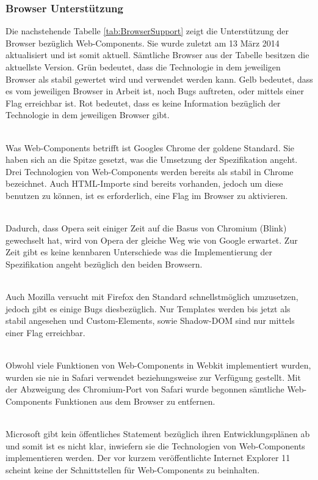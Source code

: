 \subsubsection{Browser Unterstützung}
\label{sec:3_WC_Support}

Die nachstehende Tabelle \ref{tab:BrowserSupport} zeigt die Unterstützung der Browser bezüglich Web-Components. Sie wurde zuletzt am 13 März 2014 aktualisiert und ist somit aktuell. Sämtliche Browser aus der Tabelle besitzen die aktuellste Version. Grün bedeutet, dass die Technologie in dem jeweiligen Browser als stabil gewertet wird und verwendet werden kann. Gelb bedeutet, dass es vom jeweiligen Browser in Arbeit ist, noch Bugs auftreten, oder mittels einer Flag erreichbar ist. Rot bedeutet, dass es keine Information bezüglich der Technologie in dem jeweiligen Browser gibt.

\begin{description}
 \hfill \\
Was Web-Components betrifft ist Googles Chrome der goldene Standard. Sie haben sich an die Spitze gesetzt, was die Umsetzung der Spezifikation angeht. Drei Technologien von Web-Components werden bereits als stabil in Chrome bezeichnet. Auch HTML-Importe sind bereits vorhanden, jedoch um diese benutzen zu können, ist es erforderlich, eine Flag im Browser zu aktivieren.

 \hfill \\
Dadurch, dass Opera seit einiger Zeit auf die Basus von Chromium (Blink) gewechselt hat, wird von Opera der gleiche Weg wie von Google erwartet. Zur Zeit gibt es keine kennbaren Unterschiede was die Implementierung der Spezifikation angeht bezüglich den beiden Browsern.

 \hfill \\
Auch Mozilla versucht mit Firefox den Standard schnellstmöglich umzusetzen, jedoch gibt es einige Bugs diesbezüglich. Nur Templates werden bis jetzt als stabil angesehen und Custom-Elements, sowie Shadow-DOM sind nur mittels einer Flag erreichbar.

 \hfill \\
Obwohl viele Funktionen von Web-Components in Webkit implementiert wurden, wurden sie nie in Safari verwendet beziehungsweise zur Verfügung gestellt. Mit der Abzweigung des Chromium-Port von Safari wurde begonnen sämtliche Web-Components Funktionen aus dem Browser zu entfernen.

 \hfill \\
Microsoft gibt kein öffentliches Statement bezüglich ihren Entwicklungsplänen ab und somit ist es nicht klar, inwiefern sie die Technologien von Web-Components implementieren werden. Der vor kurzem veröffentlichte Internet Explorer 11 scheint keine der Schnittstellen für Web-Components zu beinhalten.

\end{description}

